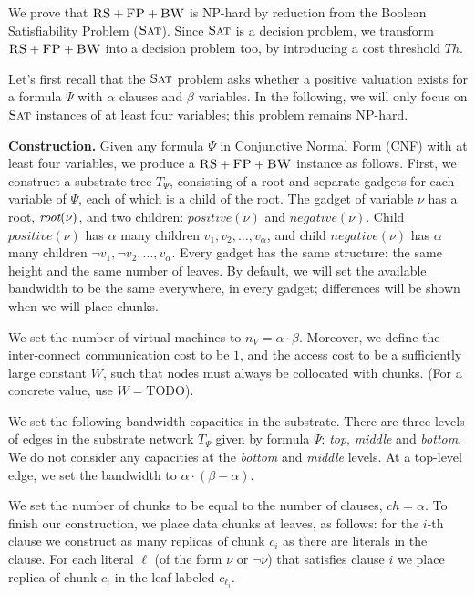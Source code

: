 \documentclass[9pt,twocolumn]{scrartcl}
\newcommand{\variab}{\nu}
\newcommand{\aroot}{\emph{root}}
\newcommand{\clauses}{\alpha}
\newcommand{\variables}{\beta}
\newcommand{\achunk}{\ensuremath{c}}
\newcommand{\FP}{\textsc{FP}}
\newcommand{\RS}{\textsc{RS}}
\newcommand{\BW}{\textsc{BW}}
\newcommand{\Tree}{\ensuremath{T}}
\newcommand{\Vms}{\ensuremath{n_V}}
\newcommand{\SAT}{\textsc{Sat}}
\newcommand{\Formula}{\ensuremath{\Psi}}
\newcommand{\ChunkTypes}{\ensuremath{ch}}
\newcommand{\Thr}{\ensuremath{Th}}
\newcommand{\positive}{\ensuremath{positive}}
\newcommand{\negative}{\ensuremath{negative}}
\begin{document}
\begin{appendix}
We prove that $\RS+\FP+\BW$ is NP-hard by reduction from the Boolean Satisfiability Problem ($\SAT$).
Since $\SAT$ is a decision
problem, we transform $\RS+\FP+\BW$ into a decision problem too, by
introducing a cost threshold $\Thr$.

Let's first recall that the $\SAT$ problem asks whether a positive valuation exists
for a formula $\Formula$ with $\clauses$ clauses and $\variables$ variables.
In the following, we will only focus on $\SAT$ instances of at least four variables;
this problem remains NP-hard.

\textbf{Construction.}
Given any formula $\Formula$ in Conjunctive Normal Form (CNF) with at least four variables, we produce
a $\RS+\FP+\BW$ instance as follows. First, we construct a substrate tree $\Tree_{\Formula}$, consisting of
a root and separate gadgets for each variable of $\Formula$, each of which
is a child of the root.
The gadget of variable $\variab$ has a root, $\aroot(\variab)$, and two children:
$\positive(\variab)$ and $\negative(\variab)$. Child $\positive(\variab)$ has $\clauses$
many children $v_1, v_2, \ldots, v_{\clauses}$, and child $\negative(\variab)$ has
$\clauses$ many children $\neg v_1, \neg v_2, \dots, v_{\clauses}$. Every
gadget has the same structure: the same height and the same number of
leaves. By default, we will set the available bandwidth to be the
same everywhere, in every gadget; differences will be shown when we
will place chunks.

We set the number of virtual machines to $\Vms = \clauses \cdot \variables$.
Moreover, we define the inter-connect communication cost to be $1$,
and the access cost to be a sufficiently large constant $W$,
such that nodes must always be collocated with chunks.
(For a concrete value, use $W=$TODO).


We set the following bandwidth capacities in the substrate. There are three
levels of edges in the substrate network $\Tree_{\Formula}$ given by formula
$\Formula$: \emph{top}, \emph{middle} and \emph{bottom}.
We do not consider any capacities at the \emph{bottom} and \emph{middle} levels.
At a top-level edge, we set the bandwidth to $\clauses \cdot (\variables -
\clauses)$.

We set the number of chunks to be equal to the number of clauses, $\ChunkTypes =
\clauses$. To finish our construction, we place data chunks at
leaves, as follows: for the $i$-th clause we
construct as many replicas of chunk $\achunk_i$ as there are literals in the
clause. For each literal $\ell$ (of the form $\variab$ or $\neg \variab$) that satisfies clause $i$ we place
replica of chunk $\achunk_i$ in the leaf labeled $\achunk_{\ell_i}$.


\end{appendix}
\end{document}

